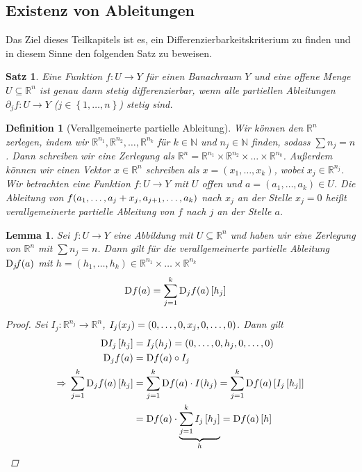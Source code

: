 \documentclass[11pt, twoside, a4paper]{article}
\theoremstyle{plain}
\newtheorem{definition}[blockelement]{Definition}
\newtheorem{lemma}[blockelement]{Lemma}
\newtheorem{satz}[blockelement]{Satz}
\numberwithin{equation}{subsection}
\newcommand{\set}[1]{\left\{#1\right\}}
\newcommand{\pair}[1]{\left(#1\right)}
\newcommand{\of}[1]{\mathopen{}\mathclose{}\bgroup\left(#1\aftergroup\egroup\right)}
\newcommand{\interv}[1]{\left[#1\right]}
\newcommand{\impl}[0]{\Rightarrow{}}
\newcommand{\fromto}{\rightarrow{}}
\DeclareMathOperator{\D}{D\!}
\newcommand{\R}{\mathbb{R}}
\newcommand{\N}{\mathbb{N}}
\begin{document}
    \subsection{Existenz von Ableitungen}

    Das Ziel dieses Teilkapitels ist es, ein Differenzierbarkeitskriterium zu finden und in diesem Sinne den folgenden Satz zu beweisen.

    \begin{satz} %
        \marginnote{[11. Jul]}
        \label{satz:existenz-ableitung}
        Eine Funktion $f: U\fromto Y$ für einen Banachraum $Y$ und eine offene Menge $U\subseteq \R^n$ ist genau dann stetig differenzierbar, wenn alle partiellen Ableitungen $\partial_j f: U\fromto Y$ ($j\in\set{1,\ldots, n}$) stetig sind.
    \end{satz}

    \begin{definition}[Verallgemeinerte partielle Ableitung]
        Wir können den $\R^n$ zerlegen, indem wir $\R^{n_1}, \R^{n_2}, \ldots, \R^{n_k}$ für $k\in\N$ und $n_j\in\N$ finden, sodass $\sum n_j = n$. Dann schreiben wir eine Zerlegung als $\R^n = \R^{n_1}\times \R^{n_2}\times\dots\times\R^{n_k}$. Außerdem können wir einen Vektor $x\in\R^n$ schreiben als $x=\pair{x_1, \ldots, x_k}$, wobei $x_j\in\R^{n_j}$.\\
        Wir betrachten eine Funktion $f: U\fromto Y$ mit $U$ offen und $a=\pair{a_1, \ldots, a_k}\in U$. Die Ableitung von $f\of{a_1, \ldots, a_{j} + x_j, a_{j+1},\ldots, a_k}$ nach $x_j$ an der Stelle $x_j = 0$ heißt verallgemeinerte partielle Ableitung von $f$ nach $j$ an der Stelle $a$.
    \end{definition}

    \begin{lemma} %
        \label{lemma:veralg-part-diff}
        Sei $f: U\fromto Y$ eine Abbildung mit $U\subseteq\R^n$ und haben wir eine Zerlegung von $\R^n$ mit $\sum n_j = n$. Dann gilt für die verallgemeinerte partielle Ableitung $\text{D}_j\! f\of{a}$ mit $h=\pair{h_1, \ldots, h_k}\in\R^{n_1}\times\dots \times\R^{n_k}$
        \begin{align*}
            \D f\of{a} &= \sum_{j=1}^{k} \text{D}_j f\of{a}\interv{h_j}
        \end{align*}
        \begin{proof}
            Sei $I_j: \R^{n_j}\fromto\R^{n}$, $I_j\of{x_j} = \pair{0,\ldots, 0, x_j, 0,\ldots, 0}$. Dann gilt
            \begin{align*}
                \D I_j\interv{h_j} &= I_j\of{h_j} = \pair{0,\ldots, 0, h_j, 0, \ldots, 0}\\
                \text{D}_j f\of{a} &= \D f\of{a}\circ I_j\\
                \impl \sum_{j=1}^{k} \text{D}_j f\of{a}\interv{h_j} &= \sum_{j=1}^{k} \D f\of{a} \cdot I\of{h_j} = \sum_{j=1}^{k} \D f\of{a}\interv{I_j\interv{h_j}}\\
                &= \D f\of{a} \cdot \underbrace{\sum_{j=1}^{k} I_j\interv{h_j}}_{h} = \D f\of{a}\interv{h}
            \end{align*}
        \end{proof}
    \end{lemma}
\end{document}
